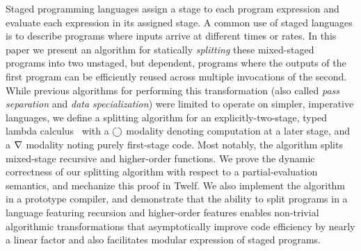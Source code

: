 
Staged programming languages assign a stage to each program expression
and evaluate each expression in its assigned stage. A common use of
staged languages is to describe programs where inputs arrive at
different times or rates. In this paper we present an algorithm for
statically {\em splitting} these mixed-staged programs into two
unstaged, but dependent, programs where the outputs of the first
program can be efficiently reused across multiple invocations of the
second. While previous algorithms for performing this transformation
(also called \emph{pass separation} and \emph{data specialization})
were limited to operate on simpler, imperative languages, we define a
splitting algorithm for an explicitly-two-stage, typed lambda
calculus \lang\ with a $\bigcirc$ modality denoting computation at a later
stage, and a $\nabla$ modality noting purely first-stage code.  Most
notably, the algorithm splits mixed-stage recursive and higher-order
functions.  We prove the dynamic correctness of our splitting
algorithm with respect to a partial-evaluation semantics, and
mechanize this proof in Twelf. We also implement the algorithm
in a prototype compiler, and demonstrate that the ability to split
programs in a language featuring recursion and higher-order features
enables non-trivial algorithmic transformations that asymptotically
improve code efficiency by nearly a linear factor and also
facilitates modular expression of staged programs.

